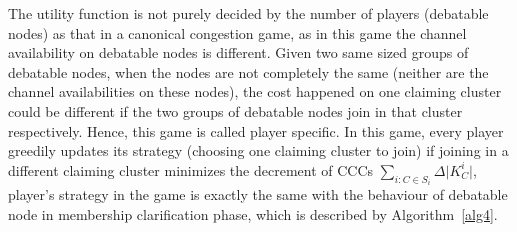 \documentclass[journal,comsoc]{IEEEtran}
\theoremstyle{mytheoremstyle}
\theoremstyle{mytheoremstyle}
\theoremstyle{mytheoremstyle}
\begin{document}
\begin{itemize}
The utility function is not purely decided by the number of players (debatable nodes) as that in a canonical congestion game, as in this game the channel availability on debatable nodes is different.
Given two same sized groups of debatable nodes, when the nodes are not completely the same (neither are the channel availabilities on these nodes), the cost happened on one claiming cluster could be different if the two groups of debatable nodes join in that cluster respectively.
Hence, this game is called player specific.
In this game, every player greedily updates its strategy (choosing one claiming cluster to join) if joining in a different claiming cluster minimizes the decrement of CCCs $\sum_{i:C\in S_i} \Delta\vert K^i_C \vert$, player's strategy in the game is exactly the same with the behaviour of debatable node in membership clarification phase, which is described by Algorithm~\ref{alg4}.




\end{itemize}

\end{document}

